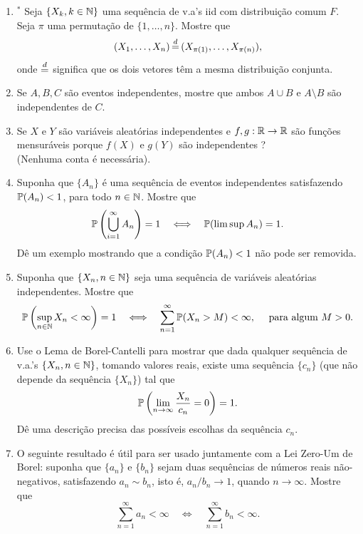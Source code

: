 \begin{enumerate}[leftmargin=*]
		
\item 
$^*$ Seja $\{X_k,k\in\N\}$ uma sequência de v.a's iid com distribuição
comum $F$. Seja $\pi$ uma permutação de $\{1,\ldots,n\}$. 
Mostre que 
	\[
		(X_1,\ldots,X_n) 
		\,{\buildrel d \over =}\, 
		(X_{\pi(1)},\ldots,X_{\pi(n)}),
	\]
onde ${\buildrel d \over =}$ significa que os dois vetores
têm a mesma distribuição conjunta. 



\item 
Se $A,B,C$ são eventos independentes, mostre que 
ambos $A\cup B$ e $A\setminus B$ são independentes de 
$C$.



\item Se $X$ e $Y$ são variáveis aleatórias independentes
e $f,g:\R\to\R$ são funções mensuráveis porque $f(X)$ e $g(Y)$
são independentes ?
\\
(Nenhuma conta é necessária).




\item
Suponha que $\{A_n\}$ é uma sequência de eventos independentes
satisfazendo $\P(A_n)<1$, para todo $n\in \N$. Mostre que 
	\[
		\P \left( \bigcup_{i=1}^{\infty} A_n \right) = 1
		\quad
		\Longleftrightarrow
		\quad
		\P(\limsup A_n) =1.
	\]
Dê um exemplo mostrando que a condição $\P(A_n)<1$ 
não pode ser removida.


\item 
Suponha que $\{X_n, n\in\N\}$ seja uma sequência de variáveis 
aleatórias independentes. Mostre que 
\[
	\P \left(  \sup_{n\in\N} X_n <\infty  \right)=1
	\quad
	\Longleftrightarrow
	\quad
	\sum_{n=1}^{\infty} \P(X_n>M) <\infty,\quad 
	\text{ para algum}\ M>0.
\]



\item
Use o Lema de Borel-Cantelli para mostrar que dada 
qualquer sequência de v.a.'s $\{X_n, n\in\N\}$, tomando valores 
reais, existe uma sequência 
$\{c_n\}$ (que não depende da sequência $\{X_n\}$) 
tal que 
	\[
		\P \left( \lim_{n\to\infty} \frac{X_n}{c_n}=0 \right)=1.
	\]
Dê uma descrição precisa das possíveis escolhas da sequência $c_n$.



\item 
O seguinte resultado é útil para ser usado juntamente 
com a Lei Zero-Um de Borel: suponha que $\{a_n\}$ 
e $\{b_n\}$ sejam duas sequências de números reais
não-negativos, satisfazendo $a_n \sim b_n$, 
isto é, $a_n/b_n\to 1$, quando $n\to\infty$.
Mostre que 
	\[	
		\sum_{n=1}^{\infty} a_n <\infty
		\quad
		\Longleftrightarrow
		\quad
		\sum_{n=1}^{\infty} b_n <\infty.
	\]	





\end{enumerate}
